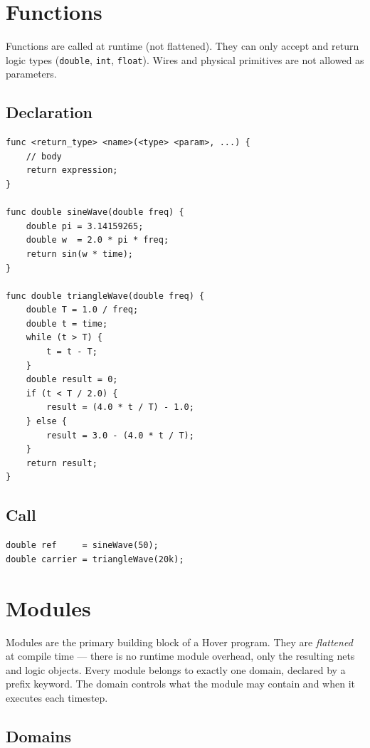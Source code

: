 \documentclass[11pt, a4paper]{article}
\newcommand{\code}[1]{\texttt{\small #1}}
\begin{document}
\section{Functions}

Functions are called at runtime (not flattened). They can only accept and
return logic types (\code{double}, \code{int}, \code{float}). Wires and
physical primitives are not allowed as parameters.

\subsection{Declaration}

\begin{lstlisting}
func <return_type> <name>(<type> <param>, ...) {
    // body
    return expression;
}

func double sineWave(double freq) {
    double pi = 3.14159265;
    double w  = 2.0 * pi * freq;
    return sin(w * time);
}

func double triangleWave(double freq) {
    double T = 1.0 / freq;
    double t = time;
    while (t > T) {
        t = t - T;
    }
    double result = 0;
    if (t < T / 2.0) {
        result = (4.0 * t / T) - 1.0;
    } else {
        result = 3.0 - (4.0 * t / T);
    }
    return result;
}
\end{lstlisting}

\subsection{Call}

\begin{lstlisting}
double ref     = sineWave(50);
double carrier = triangleWave(20k);
\end{lstlisting}

\section{Modules}

Modules are the primary building block of a Hover program. They are
\textit{flattened} at compile time — there is no runtime module overhead,
only the resulting nets and logic objects. Every module belongs to exactly
one domain, declared by a prefix keyword. The domain controls what the
module may contain and when it executes each timestep.

\subsection{Domains}
\label{sec:domains}
\end{document}
